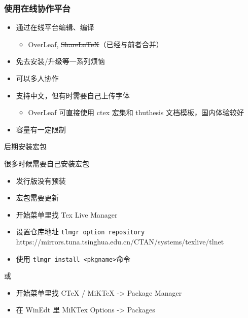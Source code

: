 \begin{frame}[fragile]
  \frametitle{使用在线协作平台}
  \begin{itemize}
    \item 通过在线平台编辑、编译
      \begin{itemize}
        \item OverLeaf, \sout{ShareLaTeX}（已经与前者合并）
      \end{itemize}
    \item 免去安装/升级等一系列烦恼
    \item 可以多人协作
    \item 支持中文，但有时需要自己上传字体
      \begin{itemize}
        \item OverLeaf 可直接使用 ctex 宏集和 thuthesis 文档模板，国内体验较好
      \end{itemize}
    \item 容量有一定限制
  \end{itemize}
\end{frame}


\begin{frame}{后期安装宏包}
  \begin{exampleblock}{很多时候需要自己安装宏包}
    \vspace*{-3mm}
    \begin{itemize}
      \item 发行版没有预装
      \item 宏包需要更新
    \end{itemize}
  \end{exampleblock}
  \vspace*{-3mm}
  \begin{exampleblock}{\TL}
    \vspace*{-3mm}
    \begin{itemize}
      \item 开始菜单里找 Tex Live Manager
      \item 设置仓库地址 \texttt{tlmgr option repository} {\footnotesize\ttfamily
        https://mirrors.tuna.tsinghua.edu.cn/CTAN/systems/texlive/tlnet}
      \item 使用 \texttt{tlmgr install <pkgname>}命令
    \end{itemize}
  \end{exampleblock}
  \vspace*{-3mm}
  \begin{exampleblock}{\CTeX 或 \MiKTeX}
    \vspace*{-3mm}
    \begin{itemize}
      \item 开始菜单里找 CTeX / MiKTeX -> Package Manager
      \item 在 WinEdt 里 MiKTex Options -> Packages
    \end{itemize}
  \end{exampleblock}
\end{frame}

